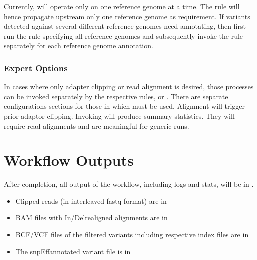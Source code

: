 \documentclass[letterpaper,10pt,english]{sphinxhowto}
\begin{document}
Currently,  will operate only on one reference genome at a time. The rule will hence propagate upstream only one reference genome as requirement. If variants detected against several different reference genomes need annotating, then first run the  rule specifying all reference genomes and subsequently invoke the  rule separately for each reference genome annotation.


\subsubsection{Expert Options}
\label{\detokenize{index:expert-options}}
In cases where only adapter clipping or read alignment is desired, those processes can be invoked separately by the respective rules,   or . There are separate configurations sections for those in  which must be used. Alignment will trigger prior adaptor clipping.
Invoking  will produce summary statistics. They will require read alignments and are meaningful for generic  runs.


\section{Workflow Outputs}
\label{\detokenize{index:workflow-outputs}}
After completion, all output of the workflow, including logs and stats, will be in .
\begin{itemize}
\item {} 
Clipped reads (in interleaved fastq format) are in 

\item {} 
BAM files with In/Del\sphinxhyphen{}realigned alignments are in 

\item {} 
BCF/VCF files of the filtered variants including respective index files are in 

\item {} 
The snpEff\sphinxhyphen{}annotated variant file is in 

\end{itemize}
\end{document}
